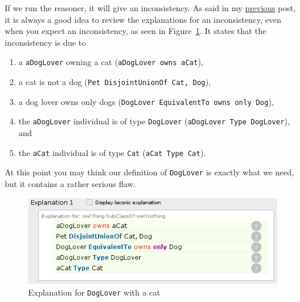 \documentclass{amsart}
\begin{document}
If we run the reasoner, it will give an inconsistency. As said in my \href{https://henrietteharmse.com/2018/04/26/understanding-owl-existential-property-restrictions/}{previous} post, it is always a good idea to review the explanations for an inconsistency, even when you expect an inconsistency, as seen in Figure~\ref{fig_ExplanationForDogLoverWithCat}. It states that the inconsistency is due to
\begin{enumerate}
 \item a \texttt{aDogLover} owning a cat (\texttt{aDogLover owns aCat}),
 \item a cat is not a dog (\texttt{Pet DisjointUnionOf Cat, Dog}),
 \item a dog lover owns only dogs (\texttt{DogLover EquivalentTo owns only Dog}),
 \item the \texttt{aDogLover} individual is of type \texttt{DogLover} (\texttt{aDogLover Type DogLover}), and
 \item the \texttt{aCat} individual is of type \texttt{Cat} (\texttt{aCat Type Cat}).
\end{enumerate}

At this point you may think our definition of \texttt{DogLover} is exactly what we need, but it contains a rather serious flaw.

    \begin{figure}
      \centering \includegraphics[trim = 0mm 0mm 0mm 0mm, clip, scale=0.65]{./ExplanationForDogLoverWithCat.png}
      \caption{Explanation for \texttt{DogLover} with a cat}\label{fig_ExplanationForDogLoverWithCat}
    \end{figure}

  
\end{document}
